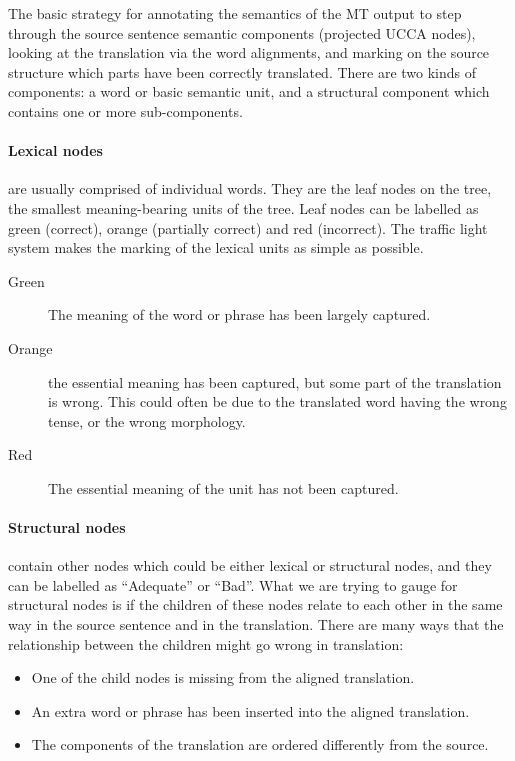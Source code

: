 \documentclass[11pt]{article}
\begin{document}
The basic strategy for annotating the semantics of the MT output to step through the source sentence semantic 
components (projected UCCA nodes), looking at the translation via the word alignments, and marking on the source structure
which parts have 
been correctly translated.
There are two kinds of components: a word or basic semantic unit, and a structural component which contains one
or more sub-components. 

\paragraph{Lexical nodes} are usually comprised of individual words. They are the leaf nodes on the tree, the smallest 
meaning-bearing
units of the tree.
Leaf nodes can be labelled as green (correct), orange (partially correct) and red (incorrect). 
The traffic light system makes the marking of the
lexical units as simple as possible.

\begin{description}
\item[Green] The meaning of the word or phrase has been largely captured.
\item[Orange] the essential meaning has been captured, but some part of the translation is wrong. This could often be due to the translated word having the wrong tense, or the wrong morphology. 
\item[Red] The essential meaning of the unit has not been captured.
\end{description}


\paragraph{Structural nodes} contain other nodes which could be either lexical or structural nodes, 
and they can be labelled as ``Adequate'' or ``Bad''. 
What we are trying to gauge for structural nodes
is if the children of these nodes
relate to each other in the same way in the source sentence and in the translation. 
There are many ways that the relationship between the children might go wrong in translation:
\begin{itemize}
\item One of the child nodes is missing from the aligned translation. 
\item An extra word or phrase has been inserted into the aligned  translation.
\item The components of the translation are ordered differently 
from
the source.
\end{itemize}
\end{document}

